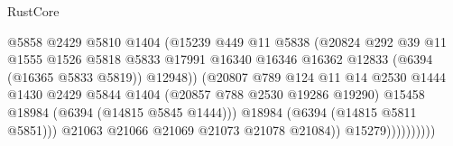 \begin{lexlean}{RustCore}
\begin{coremodule}
                                              @5858
                                              @2429
                                              @5810
                                              @1404
                                              (@15239
                                                @449
                                                @11
                                                @5838
                                                (@20824
                                                  @292
                                                  @39
                                                  @11
                                                  @1555
                                                  @1526
                                                  @5818
                                                  @5833
                                                  @17991
                                                  @16340
                                                  @16346
                                                  @16362
                                                  @12833
                                                  (@6394 (@16365 @5833 @5819))
                                                  @12948))
                                              (@20807
                                                @789
                                                @124
                                                @11
                                                @14
                                                @2530
                                                @1444
                                                @1430
                                                @2429
                                                @5844
                                                @1404
                                                (@20857 @788 @2530 @19286 @19290)
                                                @15458
                                                @18984
                                                (@6394 (@14815 @5845 @1444)))
                                              @18984
                                              (@6394 (@14815 @5811 @5851)))
                                            @21063
                                            @21066
                                            @21069
                                            @21073
                                            @21078
                                            @21084))
                                        @15279))))))))))

\end{coremodule}
\end{lexlean}
